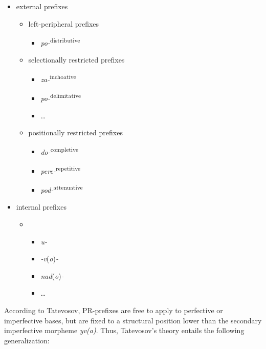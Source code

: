 \documentclass[output=paper,
colorlinks,
citecolor=brown,
newtxmath
]{langscibook}
\begin{document}
\ea\label{tatprefs}
\begin{itemize}
\item external prefixes
    \begin{itemize}
    \item left-peripheral prefixes
        \begin{itemize}
        \item \textit{po-}\textsuperscript{distributive}
        \end{itemize}
    \item selectionally restricted prefixes
        \begin{itemize}
        \item \textit{za-}\textsuperscript{inchoative}
        \item \textit{po-}\textsuperscript{delimitative}
        \item {\dots}
        \end{itemize}
    \item positionally restricted prefixes
        \begin{itemize}
        \item \textit{do-}\textsuperscript{completive}
        \item \textit{pere-}\textsuperscript{repetitive}
        \item \textit{pod-}\textsuperscript{attenuative}
        \end{itemize}
\end{itemize}
\item internal prefixes
        \begin{itemize}
        \item
            \begin{itemize}
            \item \textit{u-}
            \item \textit{-v}(\textit{o})\textit{-}
            \item \textit{nad}(\textit{o})\textit{-}
            \item {\dots}
            \end{itemize}
        \end{itemize}
\end{itemize}
\z

\noindent According to Tatevosov, PR-prefixes are free to apply to perfective or imperfective bases, but are fixed to a structural position lower than the secondary imperfective morpheme \textit{yv(a)}. Thus, Tatevosov's theory entails the following generalization:
\end{document}
